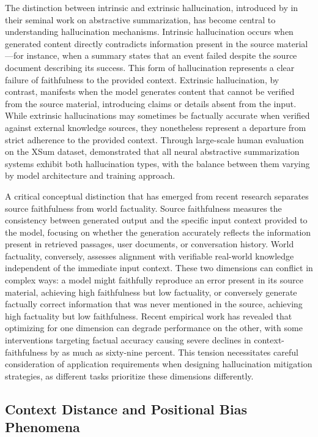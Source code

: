 \documentclass[11pt,letterpaper]{article}
\begin{document}
The distinction between intrinsic and extrinsic hallucination, introduced by \cite{maynez2020faithfulness} in their seminal work on abstractive summarization, has become central to understanding hallucination mechanisms. Intrinsic hallucination occurs when generated content directly contradicts information present in the source material---for instance, when a summary states that an event failed despite the source document describing its success. This form of hallucination represents a clear failure of faithfulness to the provided context. Extrinsic hallucination, by contrast, manifests when the model generates content that cannot be verified from the source material, introducing claims or details absent from the input. While extrinsic hallucinations may sometimes be factually accurate when verified against external knowledge sources, they nonetheless represent a departure from strict adherence to the provided context. Through large-scale human evaluation on the XSum dataset, \cite{maynez2020faithfulness} demonstrated that all neural abstractive summarization systems exhibit both hallucination types, with the balance between them varying by model architecture and training approach.

A critical conceptual distinction that has emerged from recent research separates source faithfulness from world factuality. Source faithfulness measures the consistency between generated output and the specific input context provided to the model, focusing on whether the generation accurately reflects the information present in retrieved passages, user documents, or conversation history. World factuality, conversely, assesses alignment with verifiable real-world knowledge independent of the immediate input context. These two dimensions can conflict in complex ways: a model might faithfully reproduce an error present in its source material, achieving high faithfulness but low factuality, or conversely generate factually correct information that was never mentioned in the source, achieving high factuality but low faithfulness. Recent empirical work has revealed that optimizing for one dimension can degrade performance on the other, with some interventions targeting factual accuracy causing severe declines in context-faithfulness by as much as sixty-nine percent. This tension necessitates careful consideration of application requirements when designing hallucination mitigation strategies, as different tasks prioritize these dimensions differently.

\subsection{Context Distance and Positional Bias Phenomena}
\end{document}
